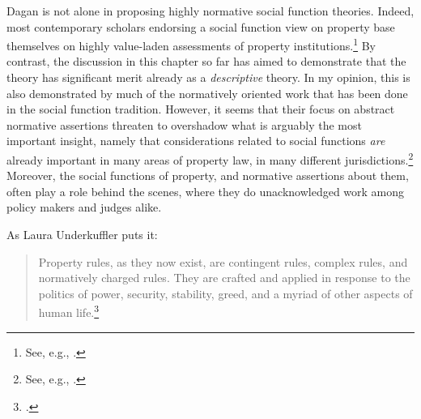 Dagan is not alone in proposing highly normative social function theories. Indeed, most contemporary scholars endorsing a social function view on property base themselves on highly value-laden assessments of property institutions.\footnote{See, e.g.,  \cite{alexander09,crawford11,davidson11,singer09,penalver09}.} By contrast, the discussion in this chapter so far has aimed to demonstrate that the theory has significant merit already as a {\it descriptive} theory. In my opinion, this is also demonstrated by much of the normatively oriented work that has been done in the social function tradition. However, it seems that their focus on abstract normative assertions threaten to overshadow what is arguably the most important insight, namely that considerations related to social functions {\it are} already important in many areas of property law, in many different jurisdictions.\footnote{See, e.g., \cite{gray94,mirow11,cunha11,bonilla11}.} Moreover, the social functions of property, and normative assertions about them, often play a role behind the scenes, where they do unacknowledged work among policy makers and judges alike.

As Laura Underkuffler puts it:

\begin{quote}
Property rules, as they now exist, are contingent rules, complex rules, and normatively charged rules. They are crafted and applied in response to the politics of power, security, stability, greed, and a myriad of other aspects of human life.\footnote{\cite[376]{underkuffler10}.}
\end{quote}

